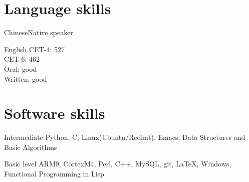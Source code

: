 \documentclass{tccv}
\begin{document}



\section{Language skills}    %

\begin{factlist}
\item{Chinese}{Native speaker}
\item{English}{
    CET-4: 527\\
    CET-6: 462\\
    Oral: good\\
    Written: good
  }

\end{factlist}

\section{Software skills}    %

\begin{factlist}

\item{Intermediate}{
    Python, C, Linux(Ubuntu/Redhat), Emacs, Data Structures and Basic Algorithms
  }

\item{Basic level}{
    ARM9, CortexM4, Perl, C++, MySQL, git, \LaTeX, Windows, Functional Programming in Lisp
  }
  
\end{factlist}
\end{document}
